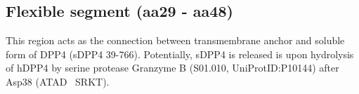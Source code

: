 \subsection{Flexible segment (aa29 - aa48)}

This region acts as the connection between transmembrane anchor and soluble form of DPP4 (sDPP4 39-766). Potentially, sDPP4 is released is upon hydrolysis of hDPP4 by serine protease Granzyme B (S01.010, UniProtID:P10144) after Asp38 (ATAD~\textbar 
SRKT).~\cite{Song_2018} 

